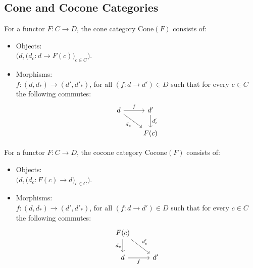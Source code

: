 \subsection{Cone and Cocone Categories}
\begin{definition}
  For a functor $F:C\to D$, the cone category $\mathrm{Cone}(F)$ consists of:
  \parencite{fong_spivak:7sketches}

  \begin{itemize}
    \item Objects:\\
      $\big(d, \big(d_c: d \to F(c)\big)_{c\in C}\big)$.
    \item Morphisms:\\
      $f: (d, d_*) \to (d', d'_*)$, for all $(f:d\to d')\in D$ such
      that for every $c\in C$ the following commutes:
      \[\begin{tikzcd}
        d & {d'} \\
        & {F(c)}
        \arrow["{d_c}"', from=1-1, to=2-2]
        \arrow["{d'_c}", from=1-2, to=2-2]
        \arrow["f", from=1-1, to=1-2]
      \end{tikzcd}\]
  \end{itemize}
\end{definition}

\begin{definition}
  For a functor $F:C\to D$, the cocone category $\mathrm{Cocone}(F)$ consists
  of:

  \begin{itemize}
    \item Objects:\\
      $\big(d, \big(d_c: F(c) \to d\big)_{c\in C}\big)$.
    \item Morphisms:\\
      $f: (d, d_*) \to (d', d'_*)$, for all $(f:d\to d')\in D$ such
      that for every $c\in C$ the following commutes:
      \[\begin{tikzcd}[ampersand replacement=\&]
        {F(c)} \\
        d \& {d'}
        \arrow["{d_c}"', from=1-1, to=2-1]
        \arrow["{d'_c}", from=1-1, to=2-2]
        \arrow["f"', from=2-1, to=2-2]
      \end{tikzcd}\]
  \end{itemize}
\end{definition}